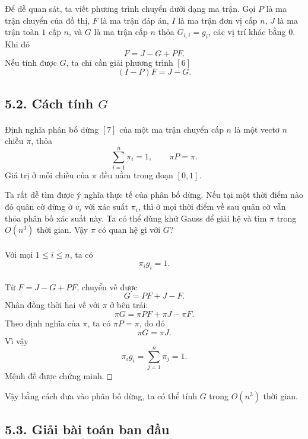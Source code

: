 \documentclass[11pt]{article}
\newcommand{\square}{\mathord{\vcenter{\hrule height .5pt
  \hbox{\vrule width .5pt height 5pt\kern5pt\vrule width .5pt}
  \hrule height .5pt}}}
\begin{document}
Để dễ quan sát, ta viết phương trình chuyển dưới dạng ma trận. Gọi \(P\) là ma
trận chuyển của đồ thị, \(F\) là ma trận đáp án, \(I\) là ma trận đơn vị cấp
\(n\), \(J\) là ma trận toàn \(1\) cấp \(n\), và \(G\) là ma trận cấp \(n\) thỏa
\(G_{i,i}=g_i\), các vị trí khác bằng \(0\). Khi đó
\[
  F=J-G+PF.
\]
Nếu tính được \(G\), ta chỉ cần giải phương trình \([6]\)
\[
  (I-P)F=J-G.
\]

\subsection*{5.2. Cách tính \(G\)}

\paragraph{}
Định nghĩa phân bố dừng \([7]\) của một ma trận chuyển cấp \(n\) là một vectơ
\(n\) chiều \(\pi\), thỏa
\[
  \sum_{i=1}^{n}\pi_i=1,\qquad \pi P=\pi.
\]
Giá trị ở mỗi chiều của \(\pi\) đều nằm trong đoạn \([0,1]\).

Ta rất dễ tìm được ý nghĩa thực tế của phân bố dừng. Nếu tại một thời điểm nào
đó quân cờ dừng ở \(v_i\) với xác suất \(\pi_i\), thì ở mọi thời điểm về sau
quân cờ vẫn thỏa phân bố xác suất này. Ta có thể dùng khử Gauss để giải hệ và
tìm \(\pi\) trong \(O(n^3)\) thời gian. Vậy \(\pi\) có quan hệ gì với \(G\)?

\paragraph{}
Với mọi \(1\le i\le n\), ta có
\[
  \pi_i g_i=1.
\]

\paragraph{}
Từ \(F=J-G+PF\), chuyển vế được
\[
  G=PF+J-F.
\]
Nhân đồng thời hai vế với \(\pi\) ở bên trái:
\[
  \pi G=\pi PF+\pi J-\pi F.
\]
Theo định nghĩa của \(\pi\), ta có \(\pi P=\pi\), do đó
\[
  \pi G=\pi J.
\]
Vì vậy
\[
  \pi_i g_i=\sum_{j=1}^{n}\pi_j=1.
\]
Mệnh đề được chứng minh. \(\square\)

Vậy bằng cách đưa vào phân bố dừng, ta có thể tính \(G\) trong \(O(n^3)\) thời
gian.

\subsection*{5.3. Giải bài toán ban đầu}
\end{document}
